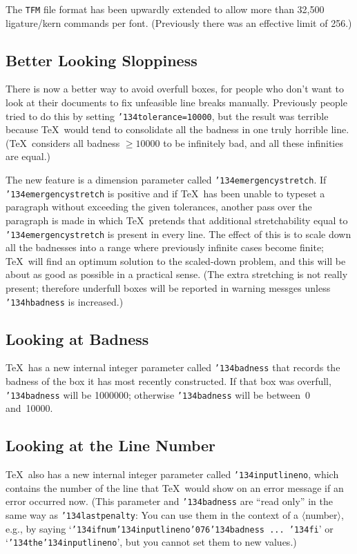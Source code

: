 The {\tt TFM} file format has been upwardly extended to allow more than 32,500
ligature/kern commands per font. (Previously there was an effective limit
of 256.)

\subsection{Better Looking Sloppiness}

There is now a better way to avoid overfull boxes, for people who don't want
to look at their documents to fix unfeasible line breaks manually. Previously
people tried to do this by setting 
{\tt{\char'134}tolerance=10000},
but the result was terrible because \TeX\ would tend to consolidate
all the badness in one truly horrible line. (\TeX\ considers all badness
$\ge10000$ to be infinitely bad, and all these infinities are equal.)

The new feature is a dimension parameter called
{\tt{\char'134}emergencystretch}.
If
{\tt{\char'134}emergencystretch}
is positive and if \TeX\ has been unable to typeset a paragraph without
exceeding the given tolerances, another pass over the paragraph is made
in which \TeX\ pretends that additional stretchability equal to
{\tt{\char'134}emergencystretch}
is present in every line. The effect of this is to scale down all the
badnesses into a range where previously infinite cases become finite; 
\TeX\ will find an optimum solution to the scaled-down problem, and this
will be about as good as possible in a practical sense. (The extra stretching
is not really present; therefore underfull boxes will be reported in warning
messges unless
{\tt{\char'134}hbadness}
is increased.)

\subsection{Looking at Badness}

\TeX\ has a new internal integer parameter called
{\tt{\char'134}badness}
that records the badness of the box it has most recently constructed.
If that box was overfull,
{\tt{\char'134}badness}
will be 1000000; otherwise
{\tt{\char'134}badness}
will be between~0 and~10000.

\subsection{Looking at the Line Number}

\TeX\ also has a new internal integer parameter called
{\tt{\char'134}inputlineno},
which contains the number of the line that \TeX\ would show on an error message
if an error occurred now. (This parameter and
{\tt{\char'134}badness}
are ``read only'' in the same way as
{\tt{\char'134}lastpenalty}:
You can use them in the context of a $\langle$number$\rangle$, e.g., by saying
`{\tt{\char'134}ifnum{\char'134}inputlineno{\char'076\char'134}badness ...\
{\char'134}fi}'
or
`{\tt{\char'134}the{\char'134}inputlineno}',
but you cannot set them to new values.)

